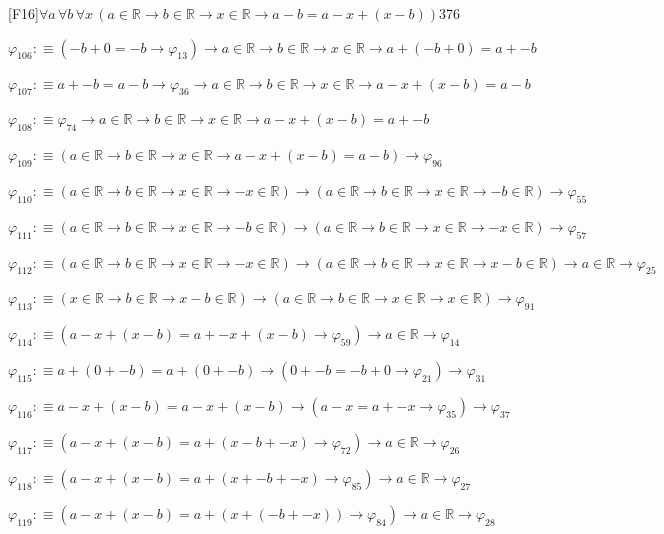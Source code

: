 \begin{fullproof}{[F16]}{$\forall a\,\forall b\,\forall x\,(a \in \mathbb{R} \to b \in \mathbb{R} \to x \in \mathbb{R} \to a - b = a - x + (x - b))$}{376}
\begin{abbrevlist}
\item $\varphi_{106} :\equiv (-b + 0 = -b \to \varphi_{13}) \to a \in \mathbb{R} \to b \in \mathbb{R} \to x \in \mathbb{R} \to a + (-b + 0) = a + -b$
\item $\varphi_{107} :\equiv a + -b = a - b \to \varphi_{36} \to a \in \mathbb{R} \to b \in \mathbb{R} \to x \in \mathbb{R} \to a - x + (x - b) = a - b$
\item $\varphi_{108} :\equiv \varphi_{74} \to a \in \mathbb{R} \to b \in \mathbb{R} \to x \in \mathbb{R} \to a - x + (x - b) = a + -b$
\item $\varphi_{109} :\equiv (a \in \mathbb{R} \to b \in \mathbb{R} \to x \in \mathbb{R} \to a - x + (x - b) = a - b) \to \varphi_{96}$
\item $\varphi_{110} :\equiv (a \in \mathbb{R} \to b \in \mathbb{R} \to x \in \mathbb{R} \to -x \in \mathbb{R}) \to (a \in \mathbb{R} \to b \in \mathbb{R} \to x \in \mathbb{R} \to -b \in \mathbb{R}) \to \varphi_{55}$
\item $\varphi_{111} :\equiv (a \in \mathbb{R} \to b \in \mathbb{R} \to x \in \mathbb{R} \to -b \in \mathbb{R}) \to (a \in \mathbb{R} \to b \in \mathbb{R} \to x \in \mathbb{R} \to -x \in \mathbb{R}) \to \varphi_{57}$
\item $\varphi_{112} :\equiv (a \in \mathbb{R} \to b \in \mathbb{R} \to x \in \mathbb{R} \to -x \in \mathbb{R}) \to (a \in \mathbb{R} \to b \in \mathbb{R} \to x \in \mathbb{R} \to x - b \in \mathbb{R}) \to a \in \mathbb{R} \to \varphi_{25}$
\item $\varphi_{113} :\equiv (x \in \mathbb{R} \to b \in \mathbb{R} \to x - b \in \mathbb{R}) \to (a \in \mathbb{R} \to b \in \mathbb{R} \to x \in \mathbb{R} \to x \in \mathbb{R}) \to \varphi_{91}$
\item $\varphi_{114} :\equiv (a - x + (x - b) = a + -x + (x - b) \to \varphi_{59}) \to a \in \mathbb{R} \to \varphi_{14}$
\item $\varphi_{115} :\equiv a + (0 + -b) = a + (0 + -b) \to (0 + -b = -b + 0 \to \varphi_{21}) \to \varphi_{31}$
\item $\varphi_{116} :\equiv a - x + (x - b) = a - x + (x - b) \to (a - x = a + -x \to \varphi_{35}) \to \varphi_{37}$
\item $\varphi_{117} :\equiv (a - x + (x - b) = a + (x - b + -x) \to \varphi_{72}) \to a \in \mathbb{R} \to \varphi_{26}$
\item $\varphi_{118} :\equiv (a - x + (x - b) = a + (x + -b + -x) \to \varphi_{85}) \to a \in \mathbb{R} \to \varphi_{27}$
\item $\varphi_{119} :\equiv (a - x + (x - b) = a + (x + (-b + -x)) \to \varphi_{84}) \to a \in \mathbb{R} \to \varphi_{28}$

\end{abbrevlist}
\end{fullproof}
